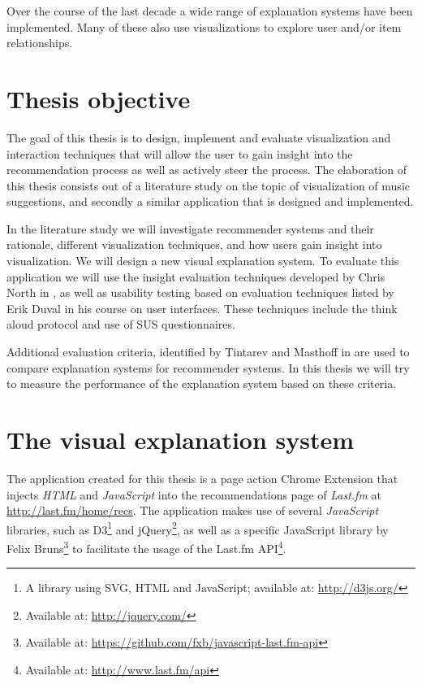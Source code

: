 Over the course of the last decade a wide range of explanation systems have been implemented. Many of these also use visualizations to explore user and/or item relationships\cite{bostandjiev:2012, crnovrsanin:2011:VRN:2421953.2422013, faridani:2010:opinionspace, gou:2011:SIF:2016656.2016671, gretarsson:2010, odonovan:2008}.


\section{Thesis objective}\label{chapter:introduction:section:objective}

The goal of this thesis is to design, implement and evaluate visualization and interaction techniques that will allow the user to gain insight into the recommendation process as well as actively steer the process. The elaboration of this thesis consists out of a literature study on the topic of visualization of music suggestions, and secondly a similar application that is designed and implemented\cite{kuleuven:2008:t313}.

In the literature study we will investigate recommender systems and their rationale, different visualization techniques, and how users gain insight into visualization. We will design a new visual explanation system. To evaluate this application we will use the insight evaluation techniques developed by Chris North in \cite{north:2006}, as well as usability testing based on evaluation techniques listed by Erik Duval in his course on user interfaces. These techniques include the think aloud protocol and use of SUS questionnaires.

Additional evaluation criteria, identified by Tintarev and Masthoff in \cite{tintarev:2007:SER:1547550.1547664} are used to compare explanation systems for recommender systems. In this thesis we will try to measure the performance of the explanation system based on these criteria.


\section{The visual explanation system}\label{chapter:introduction:section:application}

The application created for this thesis is a page action Chrome Extension that injects \emph{HTML} and \emph{JavaScript} into the recommendations page of \emph{Last.fm} at \url{http://last.fm/home/recs}. The application makes use of several \emph{JavaScript} libraries, such as D3\footnote{A library using SVG, HTML and JavaScript\cite{bostock:2012:d3js}; available at: \url{http://d3js.org/}} and jQuery\footnote{Available at: \url{http://jquery.com/}}, as well as a specific JavaScript library by Felix Bruns\footnote{Available at: \url{https://github.com/fxb/javascript-last.fm-api}} to facilitate the usage of the Last.fm API\footnote{Available at: \url{http://www.last.fm/api}}.

